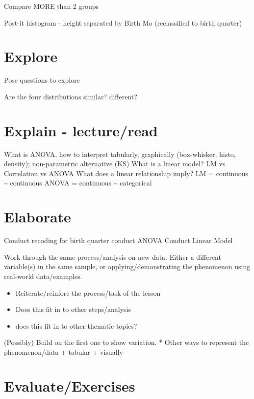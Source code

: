 \documentclass[
]{book}
\providecommand{\tightlist}{%
  \setlength{\itemsep}{0pt}\setlength{\parskip}{0pt}}
\begin{document}
Compare MORE than 2 groups

Post-it histogram - height separated by Birth Mo (reclassified to birth quarter)

\hypertarget{explore-4}{%
\section{Explore}\label{explore-4}}

Pose questions to explore

Are the four distributions similar? different?

\hypertarget{explain---lectureread-3}{%
\section{Explain - lecture/read}\label{explain---lectureread-3}}

What is ANOVA, how to interpret tabularly, graphically (box-whisker, histo, density); non-parametric alternative (KS)
What is a linear model? LM vs Correlation vs ANOVA
What does a linear relationship imply?
LM = continuous \textasciitilde{} continuous
ANOVA = continuous \textasciitilde{} categorical

\hypertarget{elaborate-4}{%
\section{Elaborate}\label{elaborate-4}}

Conduct recoding for birth quarter
conduct ANOVA
Conduct Linear Model

Work through the same process/analysis on new data. Either a different
variable(s) in the same sample, or applying/demonstrating the phenomenon
using real-world data/examples.

\begin{itemize}
\tightlist
\item
  Reiterate/reinforc the process/task of the lesson
\item
  Does this fit in to other steps/analysis
\item
  does this fit in to other thematic topics?
\end{itemize}

(Possibly) Build on the first one to show variation.
* Other ways to represent the phenomenon/data
+ tabular
+ visually

\hypertarget{evaluateexercises-4}{%
\section{Evaluate/Exercises}\label{evaluateexercises-4}}
\end{document}
